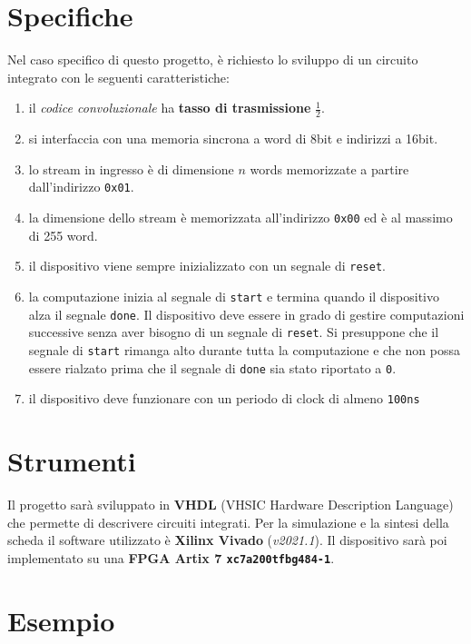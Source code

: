 \documentclass[a4paper]{report}
\begin{document}
\section{Specifiche}
Nel caso specifico di questo progetto, è richiesto lo sviluppo di un circuito integrato con le seguenti caratteristiche: 
\begin{enumerate}
\item il \textit{codice convoluzionale} ha \textbf{tasso di trasmissione} $\frac{1} {2}$.
\item si interfaccia con una memoria sincrona a word di 8bit e indirizzi a 16bit.
\item lo stream in ingresso è di dimensione $n$ words memorizzate a partire dall'indirizzo \texttt{0x01}.
\item la dimensione dello stream è memorizzata all'indirizzo \texttt{0x00} ed è al massimo di 255 word.
\item il dispositivo viene sempre inizializzato con un segnale di \texttt{reset}.
\item la computazione inizia al segnale di \texttt{start} e termina quando il dispositivo alza il segnale \texttt{done}. Il dispositivo deve essere in grado di gestire computazioni successive senza aver bisogno di un segnale di \texttt{reset}. Si presuppone che il segnale di \texttt{start} rimanga alto durante tutta la computazione e che non possa essere rialzato prima che il segnale di \texttt{done} sia stato riportato a \texttt{0}.
\item il dispositivo deve funzionare con un periodo di clock di almeno \texttt{100ns}
\end{enumerate}

\section{Strumenti}
Il progetto sarà sviluppato in \textbf{VHDL} (VHSIC Hardware Description Language) che permette di descrivere circuiti integrati.
Per la simulazione e la sintesi della scheda il software utilizzato è \textbf{Xilinx Vivado} (\textit{v2021.1}).
Il dispositivo sarà poi implementato su una \textbf{FPGA Artix 7 \texttt{xc7a200tfbg484-1}}.

\section{Esempio}



\end{document}

